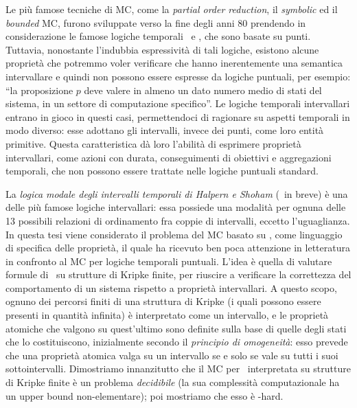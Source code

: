 Le più famose tecniche di MC, come la \emph{partial order reduction}, il \emph{symbolic} ed il \emph{bounded} MC,
furono sviluppate verso la fine degli anni 80 prendendo in considerazione le famose logiche temporali \LTL\ e \CTL, che sono basate su punti. Tuttavia, nonostante l'indubbia espressività di tali logiche, esistono alcune proprietà che potremmo voler verificare che hanno inerentemente una semantica intervallare e quindi non possono essere espresse da logiche puntuali, per esempio: ``la proposizione $p$ deve valere in almeno un dato numero medio di stati del sistema, in un settore di computazione specifico''.
%
Le logiche temporali intervallari entrano in gioco in questi casi, permettendoci di ragionare su aspetti temporali in modo diverso: esse adottano gli intervalli, invece dei punti, come loro entità primitive.
Questa caratteristica dà loro l'abilità di esprimere proprietà intervallari, come azioni con durata, conseguimenti di obiettivi e aggregazioni temporali, che non possono essere trattate nelle logiche puntuali standard.

La \emph{logica modale degli intervalli temporali di Halpern e Shoham} (\HS\  in breve) è una delle più famose logiche intervallari: essa possiede una modalità per ognuna delle 13 possibili relazioni di ordinamento fra coppie di intervalli, eccetto l'uguaglianza.
In questa tesi viene considerato il problema del MC basato su \HS , come linguaggio di specifica delle proprietà, il quale ha ricevuto ben poca attenzione in letteratura in confronto al MC per logiche temporali puntuali.
%
L'idea è quella di valutare formule di \HS\  su strutture di Kripke finite, per riuscire a verificare la correttezza del comportamento di un sistema rispetto a proprietà intervallari.
A questo scopo, ognuno dei percorsi finiti di una struttura di Kripke (i quali possono essere presenti in quantità infinita) è interpretato come un intervallo, e le proprietà atomiche che valgono su quest'ultimo sono definite sulla base di quelle degli stati che lo costituiscono, inizialmente secondo il \emph{principio di omogeneità}: esso prevede che una proprietà atomica valga su un intervallo se e solo se vale su tutti i suoi sottointervalli. 
Dimostriamo innanzitutto che il MC per \HS\  interpretata su strutture di Kripke finite è un problema \emph{decidibile} (la sua complessità computazionale ha un upper bound non-elementare); poi mostriamo che esso è \EXPSPACE-hard.

